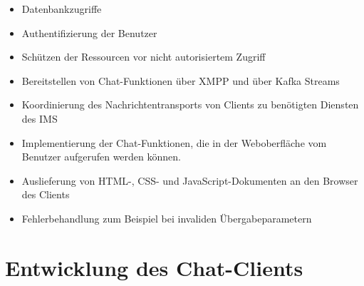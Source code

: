 \documentclass[a4paper,titlepage,halfparskip,12pt]{scrreprt}
\begin{document}
\begin{onehalfspacing}
\begin{itemize}
\item Datenbankzugriffe
\item Authentifizierung der Benutzer
\item Schützen der Ressourcen vor nicht autorisiertem Zugriff
\item Bereitstellen von Chat-Funktionen über \ac{XMPP} und über Kafka Streams
\item Koordinierung des Nachrichtentransports von Clients zu benötigten Diensten des \ac{IMS}
\item Implementierung der Chat-Funktionen, die in der Weboberfläche vom Benutzer aufgerufen werden können.
\item Auslieferung von \ac{HTML}-, \ac{CSS}- und JavaScript-Dokumenten an den Browser des Clients
\item Fehlerbehandlung zum Beispiel bei invaliden Übergabeparametern
\end{itemize}

\pagebreak

\section{Entwicklung des Chat-Clients}
\label{sec:ClientEntwicklung}


\end{onehalfspacing}
\end{document}
